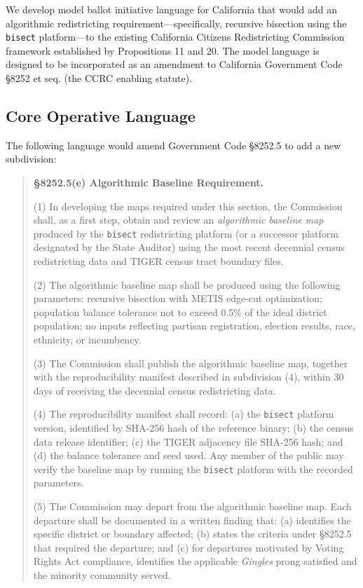 We develop model ballot initiative language for California that would add an algorithmic redistricting requirement---specifically, recursive bisection using the \texttt{bisect} platform---to the existing California Citizens Redistricting Commission framework established by Propositions 11 and 20. The model language is designed to be incorporated as an amendment to California Government Code \S8252 et seq. (the CCRC enabling statute).

\subsection{Core Operative Language}

The following language would amend Government Code \S8252.5 to add a new subdivision:

\begin{quote}
\textbf{\S8252.5(e) Algorithmic Baseline Requirement.}

(1) In developing the maps required under this section, the Commission shall, as a first step, obtain and review an \emph{algorithmic baseline map} produced by the \texttt{bisect} redistricting platform (or a successor platform designated by the State Auditor) using the most recent decennial census redistricting data and TIGER census tract boundary files.

(2) The algorithmic baseline map shall be produced using the following parameters: recursive bisection with METIS edge-cut optimization; population balance tolerance not to exceed 0.5\% of the ideal district population; no inputs reflecting partisan registration, election results, race, ethnicity, or incumbency.

(3) The Commission shall publish the algorithmic baseline map, together with the reproducibility manifest described in subdivision (4), within 30 days of receiving the decennial census redistricting data.

(4) The reproducibility manifest shall record: (a) the \texttt{bisect} platform version, identified by SHA-256 hash of the reference binary; (b) the census data release identifier; (c) the TIGER adjacency file SHA-256 hash; and (d) the balance tolerance and seed used. Any member of the public may verify the baseline map by running the \texttt{bisect} platform with the recorded parameters.

(5) The Commission may depart from the algorithmic baseline map. Each departure shall be documented in a written finding that: (a) identifies the specific district or boundary affected; (b) states the criteria under \S8252.5 that required the departure; and (c) for departures motivated by Voting Rights Act compliance, identifies the applicable \textit{Gingles} prong satisfied and the minority community served.


\end{quote}
